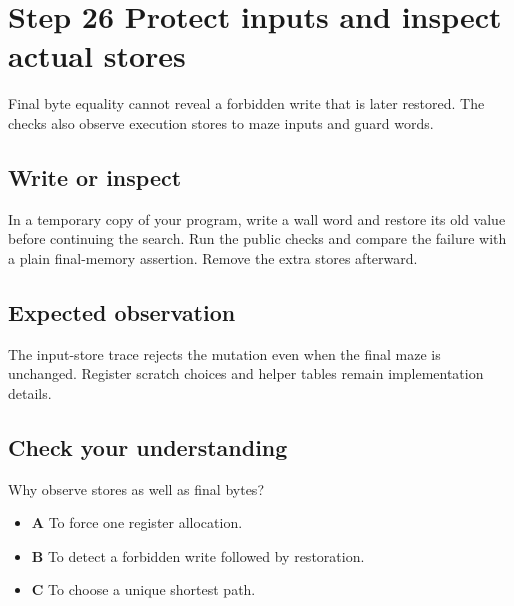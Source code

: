 \section{Step 26 Protect inputs and inspect actual stores}\label{maze-s26}

Final byte equality cannot reveal a forbidden write that is later restored. The checks also observe execution stores to maze inputs and guard words.

\subsection{Write or inspect}

In a temporary copy of your program, write a wall word and restore its old value before continuing the search. Run the public checks and compare the failure with a plain final-memory assertion. Remove the extra stores afterward.

\subsection{Expected observation}

The input-store trace rejects the mutation even when the final maze is unchanged. Register scratch choices and helper tables remain implementation details.

\subsection{Check your understanding}

Why observe stores as well as final bytes?

\begin{itemize}
  \item \textbf{A} To force one register allocation.
  \item \textbf{B} To detect a forbidden write followed by restoration.
  \item \textbf{C} To choose a unique shortest path.
\end{itemize}
